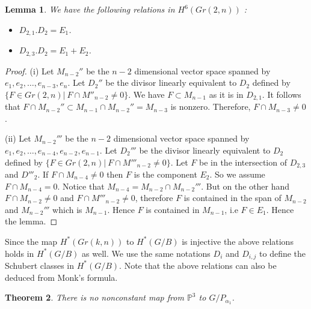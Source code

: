 \documentclass[a4paper,11pt]{amsart}
\newtheorem{theorem}{Theorem}[section]
\newtheorem{lemma}[theorem]{Lemma}
\begin{document}
\begin{lemma}\label{lm3} We have the following relations in $H^6(Gr(2,n))$ : 
\begin{itemize}
\item[(i)] $D_{2,1}. D_2 = E_1$.
\item[(ii)] $D_{2,3}. D_2 = E_1 + E_2$. 
\end{itemize}
\end{lemma}
\begin{proof} (i) Let $M_{n-2}''$ be the $n-2$ dimensional vector space spanned by $e_1,e_2, \ldots, e_{n-3}, e_{n}$. Let $D_2''$ be the divisor linearly equivalent to $D_2$ defined by 
$\{ F \in Gr(2,n) | ~F \cap M''_{n-2} \neq 0 \}$. We have $F \subset M_{n-1}$ as it is in $D_{2,1}$. It follows that $F \cap M_{n-2}'' \subset M_{n-1} \cap M_{n-2}'' = M_{n-3}$ is nonzero. Therefore, $F \cap M_{n-3} \neq 0$.

(ii) Let $M_{n-2}'''$ be the $n-2$ dimensional vector space spanned by $e_1,e_2,\ldots, e_{n-4},e_{n-2},e_{n-1}$. Let $D_2'''$ be the divisor linearly equivalent to $D_2$ defined by 
$\{ F \in Gr(2,n) | ~F \cap M'''_{n-2} \neq 0 \}$. Let $F$ be in the intersection of $D_{2,3}$ and $D'''_{2}$. If $F \cap M_{n-4} \neq 0 $ then $F$ is the component $E_2$. So we assume $F \cap M_{n-4} = 0$. Notice that $M_{n-4} = M_{n-2} \cap M_{n-2}'''$. But on the other hand $F\cap M_{n-2} \neq 0 $ and $F\cap M'''_{n-2} \neq 0 $, therefore $F$ is contained in the span of $M_{n-2}$ and $M_{n-2}'''$ which is $M_{n-1}$. Hence $F$ is contained in $M_{n-1}$, i.e $F \in E_1$. Hence the lemma.


\end{proof}

Since the map $H^{*}(Gr(k,n))$ to $H^{*}(G/B)$ is injective the above relations holds in $H^*(G/B)$ as well. We use the same notations $D_i$ and $D_{i,j}$ to define the Schubert classes in $H^*(G/B)$. Note that the above relations can also be deduced from Monk's formula. 

\begin{theorem}\label{consp3}
There is no nonconstant map from $\mathbb{P}^3$ to $G/{P_{\alpha_1}}$. 
\end{theorem}
\end{document}
